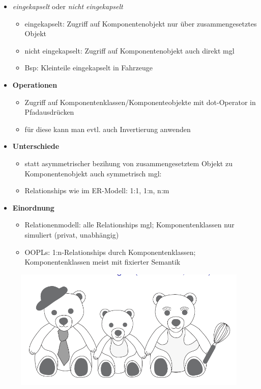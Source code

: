 \begin{framed}
\begin{description}
\begin{itemize}
			\item \textit{eingekapselt} oder \textit{nicht eingekapselt}
			\begin{itemize}
				\item eingekapselt: Zugriff auf Komponentenobjekt nur über zusammengesetztes Objekt
				\item nicht eingekapselt: Zugriff auf Komponentenobjekt auch direkt mgl
				\item Bsp: Kleinteile eingekapselt in Fahrzeuge
			\end{itemize}
		\end{itemize}
	\end{description}
\end{framed}

\begin{itemize}
	\item \textbf{Operationen}
	\begin{itemize}
		\item Zugriff auf Komponentenklassen/Komponenteobjekte mit dot-Operator in Pfadausdrücken
		\item für diese kann man evtl. auch Invertierung anwenden
	\end{itemize}
	
	\item \textbf{Unterschiede}
	\begin{itemize}
		\item statt asymmetrischer bezihung von zusammengesetztem Objekt zu Komponentenobjekt auch symmetrisch mgl:
		\item Relationships wie im ER-Modell: 1:1, 1:n, n:m
	\end{itemize}
	
	\item \textbf{Einordnung}
	\begin{itemize}
		\item Relationenmodell: alle Relationships mgl; Komponentenklassen nur simuliert (privat, unabhängig)
		\item OOPLs: 1:n-Relationships durch Komponentenklassen; Komponentenklassen meist mit fixierter Semantik
	\end{itemize}
\end{itemize}

\begin{figure}[!h]
	\centering
	\includegraphics[scale=0.5]{img/struc_4.png}
\end{figure}

